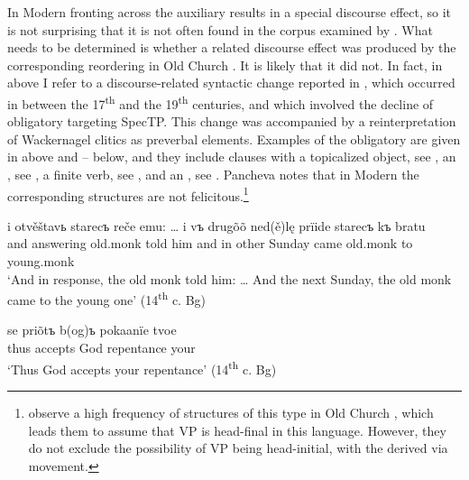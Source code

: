 \documentclass[output=paper,modfonts,newtxmath,hidelinks]{langscibook}
\begin{document}
In Modern   fronting across the  auxiliary results in a special discourse effect, so it is not surprising that it is not often found in the corpus examined by \citeauthor{pancheva2008}. What needs to be determined is whether a related discourse effect was produced by the corresponding  reordering in Old Church . It is likely that it did not. In fact, in  above I refer to a discourse-related syntactic change reported in \citet[153--154]{pancheva2005}, which occurred in  between the 17\textsuperscript{th} and the 19\textsuperscript{th} centuries, and which involved the decline of obligatory  targeting SpecTP. This change was accompanied by a reinterpretation of Wackernagel  clitics as preverbal elements. Examples of the obligatory  are given in  above and -- below, and they include clauses with a topicalized object, see , an  , see , a finite verb, see , and an , see . Pancheva notes that in Modern  the corresponding structures are not felicitous.\footnote{\label{11:fn3}\citet{dimitrovavulchanova-vulchanov2008} observe a high frequency of structures of this type in Old Church , which leads them to assume that VP is head-final in this language. However, they do not exclude the possibility of VP being head-initial, with the  derived via movement.}

\largerpage
\ea \label{11:ex18}
	\gll i otvěštavь starecъ reče emu: {\dots} i vъ drugõõ ned(ě)lę prïide starecъ kъ bratu\\
     and answering old.monk told him {} and in other Sunday came old.monk to young.monk\\
	\glt `And in response, the old monk told him: {\dots} And the next Sunday, the old monk came to the young one' \hfill (14\textsuperscript{th} c. Bg)
\z

\ea \label{11:ex19}
	\gll se priõtъ b(og)ъ pokaanïe tvoe\\
     thus accepts God repentance your \\
	\glt `Thus God accepts your repentance' \hfill (14\textsuperscript{th} c. Bg)
\z
\end{document}
